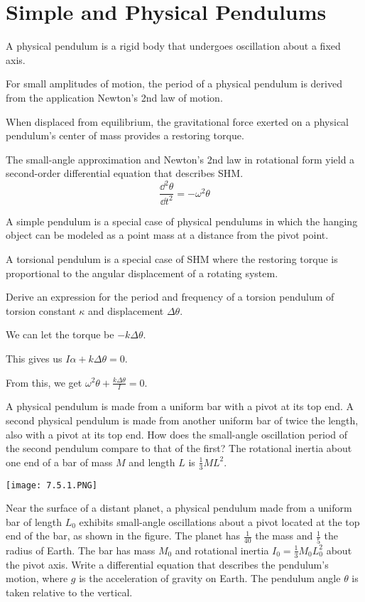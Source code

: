 \documentclass[../mech.tex]{subfiles}
\begin{document}
\section{Simple and Physical Pendulums}
A physical pendulum is a rigid body that undergoes oscillation about a fixed axis.

For small amplitudes of motion, the period of a physical pendulum is derived from the application Newton's 2nd law of motion.

When displaced from equilibrium, the gravitational force exerted on a physical pendulum's center of mass provides a restoring torque.

The small-angle approximation and Newton's 2nd law in rotational form yield a second-order differential equation that describes SHM. 
\[ \frac{\dd^2 \theta}{\dd t^2}=-\omega^2\theta \]

A simple pendulum is a special case of physical pendulums in which the hanging object can be modeled as a point mass at a distance from the pivot point.

A torsional pendulum is a special case of SHM where the restoring torque is proportional to the angular displacement of a rotating system.

\begin{example}
    Derive an expression for the period and frequency of a torsion pendulum of torsion constant $\kappa$ and displacement $\Delta \theta$.

    We can let the torque be $-k\Delta \theta$.

    This gives us $I\alpha + k\Delta \theta = 0$.

    From this, we get $\omega^2 \theta + \frac{k\Delta \theta}{I}=0$.
\end{example}

\ex A physical pendulum is made from a uniform bar with a pivot at its top end. A second physical pendulum is made from another uniform bar of twice the length, also with a pivot at its top end. How does the small-angle oscillation period of the second pendulum compare to that of the first?
The rotational inertia about one end of a bar of mass $M$ and length $L$ is $\frac{1}{3}ML^2$.

\ex \begin{center}
    \texttt{[image: 7.5.1.PNG]}
\end{center}
Near the surface of a distant planet, a physical pendulum made from a uniform bar of length $L_0$ exhibits small-angle oscillations about a pivot located at the top end of the bar, as shown in the figure.
The planet has $\frac{1}{40}$ the mass and $\frac{1}{5}$ the radius of Earth. The bar has mass $M_0$ and rotational inertia $I_0=\frac{1}{3}M_0L_0^2$ about the pivot axis. Write a differential equation that describes 
the pendulum's motion, where $g$ is the acceleration of gravity on Earth. The pendulum angle $\theta$ is taken relative to the vertical.
\end{document}

